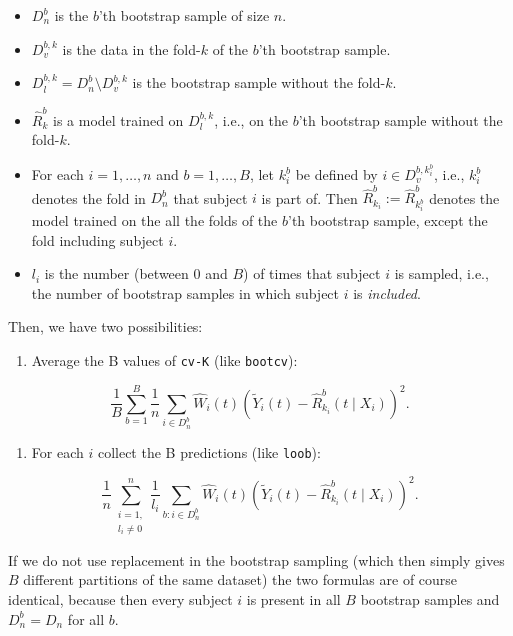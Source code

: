 \documentclass{article}
\begin{document}
\begin{itemize}
\item \(D_n^b\) is the \(b\)'th bootstrap sample of size \(n\).
\item \(D_v^{b,k}\) is the data in the fold-\(k\) of the \(b\)'th bootstrap sample.
\item \(D_l^{b, k} = D^b_n \setminus D_v^{b,k}\)  is the bootstrap sample
without the fold-\(k\).
\item \(\hat{R}^b_k\) is a model trained on \(D_l^{b, k}\), i.e., on the
\(b\)'th bootstrap sample without the fold-\(k\).
\item For each \(i = 1, \dots, n\) and \(b = 1, \dots, B\), let \(k_i^b\) be
defined by \(i \in D^{b, k_i^b}_v\), i.e., \(k_i^b\) denotes the fold in
\(D_n^b\) that subject \(i\) is part of. Then \(\hat{R}^b_{k_i} :=
  \hat{R}^b_{k^b_i}\) denotes the model trained on the all the folds of the
\(b\)'th bootstrap sample, except the fold including subject \(i\).
\item \(l_i\) is the number (between \(0\) and \(B\)) of times that subject \(i\) is sampled,
i.e., the number of bootstrap samples in
which subject \(i\) is \emph{included}.
\end{itemize}

Then, we have two
possibilities:

\begin{enumerate}
\item Average the B values of \texttt{cv-K} (like \texttt{bootcv}):
\end{enumerate}
\begin{equation*}
  \frac{1}{B}\sum_{b=1}^{B}\frac{1}{n}\sum_{i \in D^b_n} \hat{W}_i(t)
  \left ( \tilde{Y}_i(t) - \hat{R}_{k_i}^b(t \mid X_i)  \right)^2 .
\end{equation*}
\begin{enumerate}
\item For each \(i\) collect the B predictions (like \texttt{loob}):
\end{enumerate}
\begin{equation*}
  \frac{1}{n}\sum_{\substack{i = 1, \\ l_i \not = 0}}^n
  \frac{1}{l_i} \sum_{b : i \in D^b_n} \hat{W}_i(t) \left(
    \tilde{Y}_i(t) - \hat{R}_{k_i}^b(t \mid X_i) \right)^2.
\end{equation*}

If we do not use replacement in the bootstrap sampling (which then
simply gives \(B\) different partitions of the same dataset) the two
formulas are of course identical, because then every subject \(i\) is
present in all \(B\) bootstrap samples and \(D_n^b = D_n\) for all \(b\).
\end{document}
